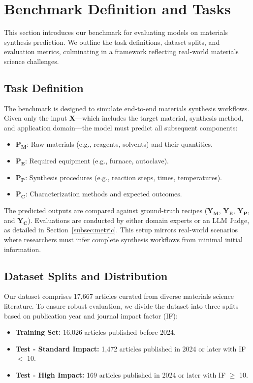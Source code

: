 \section{Benchmark Definition and Tasks}
\label{sec:benchmark}

This section introduces our benchmark for evaluating models on materials synthesis prediction. We outline the task definitions, dataset splits, and evaluation metrics, culminating in a framework reflecting real-world materials science challenges.

\subsection{Task Definition}
The benchmark is designed to simulate end-to-end materials synthesis workflows. Given only the input \textbf{X}—which includes the target material, synthesis method, and application domain—the model must predict all subsequent components:  
\begin{itemize}
    \item \(\mathbf{P_M}\): Raw materials (e.g., reagents, solvents) and their quantities.
    \item \(\mathbf{P_E}\): Required equipment (e.g., furnace, autoclave).
    \item \(\mathbf{P_P}\): Synthesis procedures (e.g., reaction steps, times, temperatures).
    \item \(\mathbf{P_C}\): Characterization methods and expected outcomes.
\end{itemize}

The predicted outputs are compared against ground-truth recipes (\(\mathbf{Y_M}\), \(\mathbf{Y_E}\), \(\mathbf{Y_P}\), and \(\mathbf{Y_C}\)). Evaluations are conducted by either domain experts or an LLM Judge, as detailed in Section~\ref{subsec:metric}. This setup mirrors real-world scenarios where researchers must infer complete synthesis workflows from minimal initial information.

\subsection{Dataset Splits and Distribution}
Our dataset comprises 17,667 articles curated from diverse materials science literature. To ensure robust evaluation, we divide the dataset into three splits based on publication year and journal impact factor (IF):
\begin{itemize}
    \item \textbf{Training Set:} 16,026 articles published before 2024.
    \item \textbf{Test - Standard Impact:} 1,472 articles published in 2024 or later with IF $<$ 10.
    \item \textbf{Test - High Impact:} 169 articles published in 2024 or later with IF $\geq$ 10.
\end{itemize}

